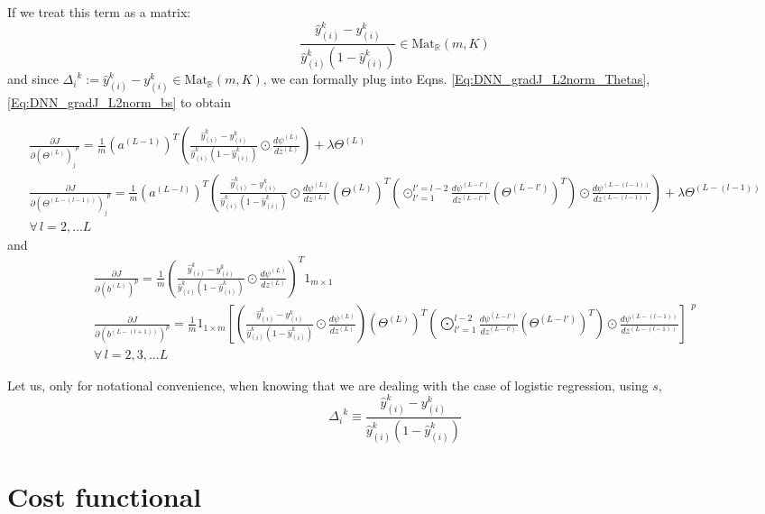 \documentclass[10pt]{amsart}
\begin{document}
\begin{multicols*}{2}

If we treat this term as a matrix:
\[
 \frac{\widehat{y}_{(i)}^k - y_{(i)}^k }{ \widehat{y}_{(i)}^k (1 - \widehat{y}_{(i)}^k )} \in \text{Mat}_{\mathbb{R}}(m,K) 
\]
and since $\Delta_i^{\  \   k} := \widehat{y}_{(i)}^k - y_{(i)}^k \in \text{Mat}_{\mathbb{R}}(m,K)$, we can formally plug into Eqns. \ref{Eq:DNN_gradJ_L2norm_Thetas}, \ref{Eq:DNN_gradJ_L2norm_bs} to obtain 

\[
\begin{gathered}
\frac{ \partial J }{ \partial (\Theta^{(L)})_j^{\  \  p} } = \frac{1}{m} (a^{(L-1)})^T \left(  \frac{\widehat{y}_{(i)}^k - y_{(i)}^k }{ \widehat{y}_{(i)}^k (1 - \widehat{y}_{(i)}^k )} \odot \frac{d\psi^{(L)} }{ dz^{(L)} } \right) + \lambda \Theta^{(L)}	\\
\frac{ \partial J }{ \partial (\Theta^{(L-(l-1))})_j^{\  \  p} } = \frac{1}{m} (a^{(L-l)})^T \left(  \frac{\widehat{y}_{(i)}^k - y_{(i)}^k }{ \widehat{y}_{(i)}^k (1 - \widehat{y}_{(i)}^k )} \odot \frac{d\psi^{(L)}}{dz^{(L)} } (\Theta^{(L)})^T \left( \odot_{l'=1}^{l'=l-2} \frac{d\psi^{(L-l')}}{dz^{(L-l') } } (\Theta^{(L-l')})^T \right) \odot \frac{d\psi^{(L-(l-1)) } }{ dz^{(L-(l-1)) } } \right) + \lambda \Theta^{(L-(l-1)) } \\
\forall \, l = 2,\dots L 
\end{gathered}
\]
and 
\[
\begin{gathered}
\frac{\partial J}{ \partial (b^{(L)})^p } = \frac{1}{m} ( \frac{\widehat{y}_{(i)}^k - y_{(i)}^k }{ \widehat{y}_{(i)}^k (1 - \widehat{y}_{(i)}^k )} \odot \frac{d\psi^{(L)}}{dz^{(L)}})^T 1_{m\times 1}   \\
\frac{ \partial J }{ \partial (b^{(L-(l+1) )} )^p } =  \frac{1}{m}  1_{1\times m } \left[ (  \frac{\widehat{y}_{(i)}^k - y_{(i)}^k }{ \widehat{y}_{(i)}^k (1 - \widehat{y}_{(i)}^k )} \odot \frac{d\psi^{(L)} }{ dz^{(L)} } )(\Theta^{(L)})^T \left( \bigodot^{l-2}_{ l'=1} \frac{d \psi^{(L-l')} }{ dz^{(L-l')}} (\Theta^{(L-l')})^T \right) \odot \frac{d\psi^{ (L-(l-1))} }{ dz^{(L-(l-1))}} \right]^{\  \  p } \\
\forall \, l = 2,3, \dots L
\end{gathered}\]

Let us, only for notational convenience, when knowing that we are dealing with the case of logistic regression, using $s$, 
\[
 \Delta_i^{\  \  k } \equiv \frac{\widehat{y}_{(i)}^k - y_{(i)}^k }{ \widehat{y}_{(i)}^k (1 - \widehat{y}_{(i)}^k )}
\]

\section{Cost functional}


\end{multicols*}
\end{document}
